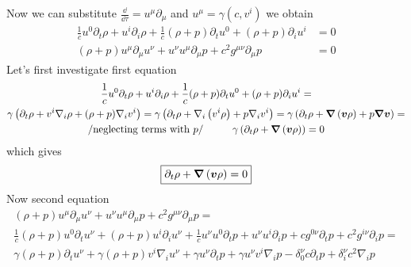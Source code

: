 \problem

Now we can substitute $\frac{\dd}{\dd \tau} = u^\mu \partial_\mu$ and $u^\mu =
    \gamma(c,v^i)$ we obtain
%
\begin{subequations}
    \begin{align}
        \frac{1}{c} u^0 \partial_t \rho +
        u^i \partial_i \rho  +
        \frac{1}{c} (\rho + p)\partial_t u^0 +
        (\rho + p)\partial_i u^i      & = 0 \\
        (\rho + p) u^\mu \partial_\mu u^\nu +
        u^\nu u^\mu \partial_\mu p +
        c^2 g^{\mu\nu} \partial_\mu p & = 0
    \end{align}
\end{subequations}
%
Let's first investigate first equation
%
\begin{multline}
    \frac{1}{c} u^0 \partial_t \rho +
    u^i \partial_i \rho  +
    \frac{1}{c} (\rho + p)\partial_t u^0 +
    (\rho + p)\partial_i u^i  = \\
    \gamma \left(\partial_t \rho +
    v^i \nabla_i \rho  +
    (\rho + p)\nabla_i v^i\right)  =
    \gamma \left(\partial_t \rho +
    \nabla_i \left(v^i  \rho\right)  +
    p \nabla_i v^i\right) =
    \gamma \left(\partial_t \rho +
    \boldsymbol{\nabla} \left(\boldsymbol{v}  \rho\right)  +
    p \boldsymbol{\nabla} \boldsymbol{v}\right) = \\
    /\text{neglecting terms with $p$}/ \hspace{1cm}
    \gamma \left(\partial_t \rho +
    \boldsymbol{\nabla} \left(\boldsymbol{v}  \rho\right)\right) = 0
\end{multline}
%
which gives
%
\begin{equation}
    \boxed{\partial_t \rho +
        \boldsymbol{\nabla} \left(\boldsymbol{v}  \rho\right) = 0}
\end{equation}
%
Now second equation
%
\begin{multline}
    (\rho + p) u^\mu \partial_\mu u^\nu +
    u^\nu u^\mu \partial_\mu p +
    c^2 g^{\mu\nu} \partial_\mu p  =  \\
    \frac{1}{c} (\rho + p) u^0 \partial_t u^\nu +
    (\rho + p) u^i \partial_i u^\nu +
    \frac{1}{c} u^\nu u^0 \partial_t p +
    u^\nu u^i \partial_i p +
    c g^{0\nu} \partial_t p +
    c^2 g^{i\nu} \partial_i p =  \\
    \gamma (\rho + p) \partial_t u^\nu +
    \gamma (\rho + p) v^i \nabla_i u^\nu +
    \gamma u^\nu \partial_t p +
    \gamma u^\nu v^i \nabla_i p -
    \delta^\nu_0 c \partial_t p +
    \delta^\nu_i c^2 \nabla_i p
\end{multline}
